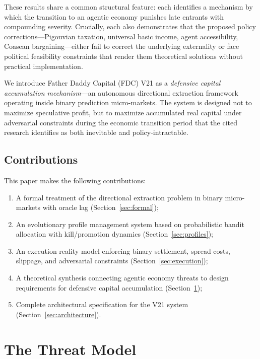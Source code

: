 \documentclass[11pt,a4paper]{article}
\begin{document}
These results share a common structural feature: each identifies a mechanism by which the transition to an agentic economy punishes late entrants with compounding severity. Crucially, each also demonstrates that the proposed policy corrections---Pigouvian taxation, universal basic income, agent accessibility, Coasean bargaining---either fail to correct the underlying externality or face political feasibility constraints that render them theoretical solutions without practical implementation.

We introduce Father Daddy Capital (FDC) V21 as a \emph{defensive capital accumulation mechanism}---an autonomous directional extraction framework operating inside binary prediction micro-markets. The system is designed not to maximize speculative profit, but to maximize accumulated real capital under adversarial constraints during the economic transition period that the cited research identifies as both inevitable and policy-intractable.

\subsection{Contributions}

This paper makes the following contributions:

\begin{enumerate}
    \item A formal treatment of the directional extraction problem in binary micro-markets with oracle lag (Section~\ref{sec:formal});
    \item An evolutionary profile management system based on probabilistic bandit allocation with kill/promotion dynamics (Section~\ref{sec:profiles});
    \item An execution reality model enforcing binary settlement, spread costs, slippage, and adversarial constraints (Section~\ref{sec:execution});
    \item A theoretical synthesis connecting agentic economy threats to design requirements for defensive capital accumulation (Section~\ref{sec:threat});
    \item Complete architectural specification for the V21 system (Section~\ref{sec:architecture}).
\end{enumerate}

\section{The Threat Model}\label{sec:threat}
\end{document}
